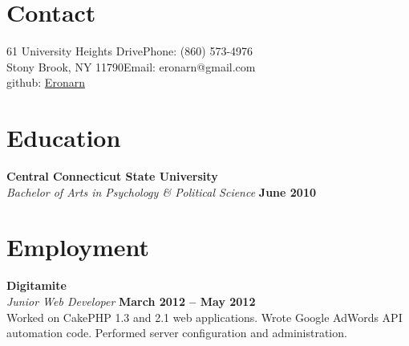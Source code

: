 \documentclass[margin,line]{resume}
\begin{document}
\begin{resume}

    \section{\mysidestyle Contact}

    61 University Heights Drive\hfill Phone: (860) 573-4976          \vspace{0mm}\\\vspace{0mm}%
    Stony Brook, NY 11790\hfill Email: eronarn@gmail.com  \vspace{0mm}\\\vspace{-4.5mm}%
    \hfill github: \href{https://github.com/Eronarn}{Eronarn}  \vspace{0mm}\\\vspace{-4.5mm}%
    \section{\mysidestyle Education}

    \textbf{Central Connecticut State University} \vspace{2mm}\\\vspace{1mm}%
    \textsl{Bachelor of Arts in Psychology \& Political Science} \hfill \textbf{June 2010}\vspace{-3mm}\\\vspace{-1mm}%

    \section{\mysidestyle Employment}

    \textbf{Digitamite} \vspace{2mm}\\\vspace{1mm}%
    \textsl{Junior Web Developer} \hfill \textbf{March 2012 -- May 2012}\\
    Worked on CakePHP 1.3 and 2.1 web applications. Wrote Google AdWords API automation code. Performed server configuration and administration.


\end{resume}
\end{document}
